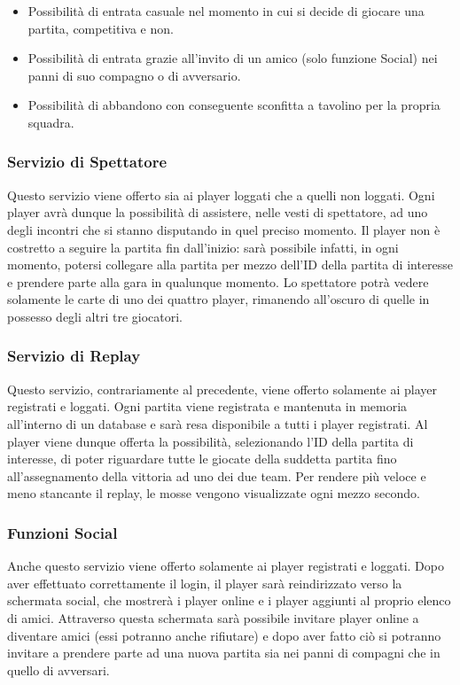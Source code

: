             \begin {itemize}
            \item Possibilità di entrata casuale nel momento in cui si decide di giocare una partita, competitiva e non.
            \item Possibilità di entrata grazie all'invito di un amico (solo funzione Social) nei panni di suo compagno o di avversario.
            \item Possibilità di abbandono con conseguente sconfitta a tavolino per la propria squadra.
            \end {itemize}

            \subsubsection[Servizio di Spettatore]{\large {Servizio di Spettatore}\label{subsub:requirements:viewer}}
            Questo servizio viene offerto sia ai player loggati che a quelli non loggati. Ogni player avrà dunque la possibilità di assistere, nelle vesti di spettatore, ad uno degli incontri che si stanno disputando in quel preciso momento. Il player non è costretto a seguire la partita fin dall'inizio: sarà possibile infatti, in ogni momento, potersi collegare alla partita per mezzo dell'ID della partita di interesse e prendere parte alla gara in qualunque momento. Lo spettatore potrà vedere solamente le carte di uno dei quattro player, rimanendo all'oscuro di quelle in possesso degli altri tre giocatori.

            \subsubsection[Servizio di Replay]{\large {Servizio di Replay}\label{subsub:requirements:replay}}
            Questo servizio, contrariamente al precedente, viene offerto solamente ai player registrati e loggati. Ogni partita viene registrata e mantenuta in memoria all'interno di un database e sarà resa disponibile a tutti i player registrati. Al player viene dunque offerta la possibilità, selezionando l'ID della partita di interesse, di poter riguardare tutte le giocate della suddetta partita fino all'assegnamento della vittoria ad uno dei due team. Per rendere più veloce e meno stancante il replay, le mosse vengono visualizzate ogni mezzo secondo.

             \subsubsection[Funzioni Social]{\large {Funzioni Social}\label{subsub:requirements:social}}
             Anche questo servizio viene offerto solamente ai player registrati e loggati. Dopo aver effettuato correttamente il login, il player sarà reindirizzato verso la schermata social, che mostrerà i player online e i player aggiunti al proprio elenco di amici. Attraverso questa schermata sarà possibile invitare player online a diventare amici (essi potranno anche rifiutare) e dopo aver fatto ciò si potranno invitare a prendere parte ad una nuova partita sia nei panni di compagni che in quello di avversari.

